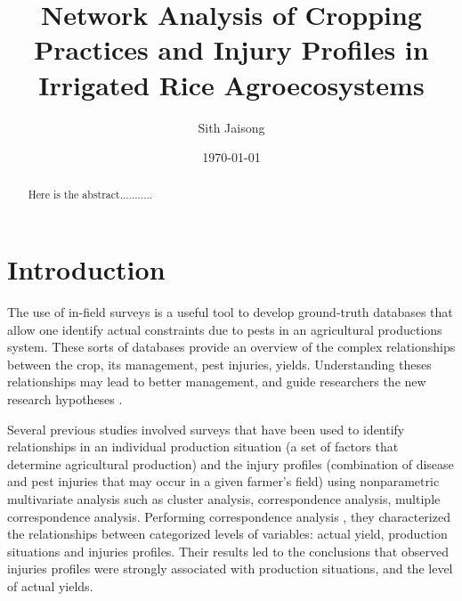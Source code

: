 \documentclass[a4paper]{article}
\title{Network Analysis of Cropping Practices and Injury Profiles in Irrigated Rice Agroecosystems}
\author{Sith Jaisong}
\date{\today}
\begin{document}
\maketitle

\begin{abstract}
Here is the abstract...........
\end{abstract}

\section*{Introduction}

The use of in-field surveys is a useful tool to develop ground-truth databases that allow one identify actual constraints due to pests in an agricultural productions system. These sorts of databases provide an overview of the complex relationships between the crop, its management, pest injuries, yields. Understanding theses relationships may lead to better management, and guide researchers the new research hypotheses \citep{mew:2004kh, Savary:2006to}. 


Several previous studies \citep{Savary:2000char, savary2000quanti, savary2005multiple, dong2010characterization, Reddy:2011hl} involved surveys that have been used to identify relationships in an individual production situation (a set of factors that determine agricultural production) and the injury profiles (combination of disease and pest injuries that may occur in a given farmer's field) using nonparametric multivariate analysis such as cluster analysis, correspondence analysis, multiple correspondence analysis. Performing correspondence analysis \citep{savary1997new}, they characterized the relationships between categorized levels of variables: actual yield, production situations and injuries profiles. Their results led to the conclusions that observed injuries profiles were strongly associated with production situations, and the level of actual yields.
\end{document}
